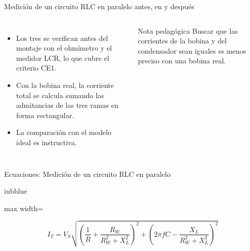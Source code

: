\documentclass[aspectratio=169,11pt,xcolor={table}]{beamer}
\begin{document}
\begin{frame}{{\normalsize Medición de un circuito RLC en paralelo antes, en y después}}
\begin{columns}[c,onlytextwidth]
\small
\begin{itemize}\setlength{\itemsep}{4pt}
  \item Los tres se verifican antes del montaje con el ohmímetro y el medidor LCR, lo que cubre el criterio CE1.
  \item Con la bobina real, la corriente total se calcula sumando las admitancias de las tres ramas en forma rectangular.
  \item La comparación con el modelo ideal es instructiva.
\end{itemize}
\begin{cardO}{Nota pedagógica}
\footnotesize Buscar que las corrientes de la bobina y del condensador sean iguales es menos preciso con una bobina real.
\end{cardO}
\end{columns}
\end{frame}

\begin{frame}{{\normalsize Ecuaciones: Medición de un circuito RLC en paralelo}}
\begin{cajaplana}{iubblue}
\centering
\begin{adjustbox}{max width=\linewidth}
\begin{minipage}{1.23\linewidth}
{\large
\begin{equation*}
  I_T = V_S\sqrt{\left(\frac{1}{R} + \frac{R_W}{R_W^{2} + X_L^{2}}\right)^{2} + \left(2\pi f C - \frac{X_L}{R_W^{2} + X_L^{2}}\right)^{2}}
\end{equation*}
}
\end{minipage}
\end{adjustbox}
\end{cajaplana}
\end{frame}
\end{document}
